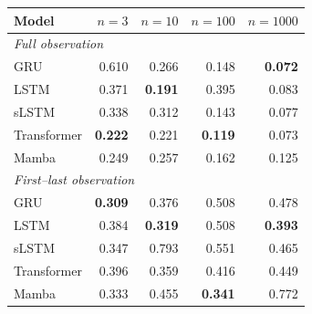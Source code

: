 \begin{tabular}{lrrrr}
\toprule
Model & $n{=}3$ & $n{=}10$ & $n{=}100$ & $n{=}1000$ \\
\midrule
\multicolumn{5}{l}{\emph{Full observation}} \\
GRU & 0.610 & 0.266 & 0.148 & \textbf{0.072} \\
LSTM & 0.371 & \textbf{0.191} & 0.395 & 0.083 \\
sLSTM & 0.338 & 0.312 & 0.143 & 0.077 \\
Transformer & \textbf{0.222} & 0.221 & \textbf{0.119} & 0.073 \\
Mamba & 0.249 & 0.257 & 0.162 & 0.125 \\
\midrule
\multicolumn{5}{l}{\emph{First--last observation}} \\
GRU & \textbf{0.309} & 0.376 & 0.508 & 0.478 \\
LSTM & 0.384 & \textbf{0.319} & 0.508 & \textbf{0.393} \\
sLSTM & 0.347 & 0.793 & 0.551 & 0.465 \\
Transformer & 0.396 & 0.359 & 0.416 & 0.449 \\
Mamba & 0.333 & 0.455 & \textbf{0.341} & 0.772 \\
\bottomrule
\end{tabular}
